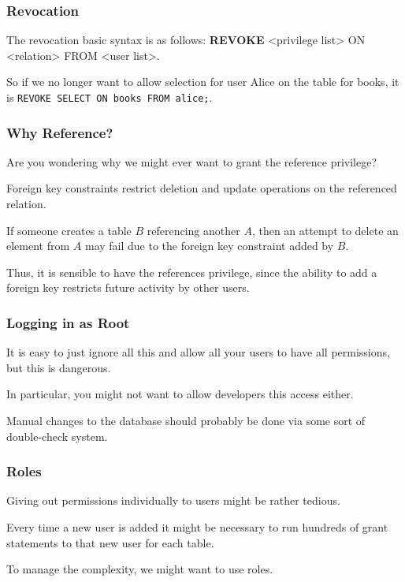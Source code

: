 \begin{frame}
\frametitle{Revocation}

The revocation basic syntax is as follows: \textbf{REVOKE} <privilege list> ON <relation> FROM <user list>.

So if we no longer want to allow selection for user Alice on the table for books, it is \texttt{REVOKE SELECT ON books FROM alice;}. 

\end{frame}



\begin{frame}
\frametitle{Why Reference?}

Are  you wondering why we might ever want to grant the reference privilege?

Foreign key constraints restrict deletion and update operations on the referenced relation. 

If someone creates a table $B$ referencing another $A$, then an attempt to delete an element from $A$ may fail due to the foreign key constraint added by $B$. 

Thus, it is sensible to have the references privilege, since the ability to add a foreign key restricts future activity by other users.

\end{frame}



\begin{frame}
\frametitle{Logging in as Root}

It is easy to just ignore all this and allow all your users to have all permissions, but this is dangerous. 

In particular, you might not want to allow developers this access either. 

Manual changes to the database should probably be done via some sort of double-check system.


\end{frame}



\begin{frame}
\frametitle{Roles}

Giving out permissions individually to users might be rather tedious. 

Every time a new user is added it might be necessary to run hundreds of grant statements to that new user for each table.

To manage the complexity, we might want to use \alert{roles}. 

\end{frame}




